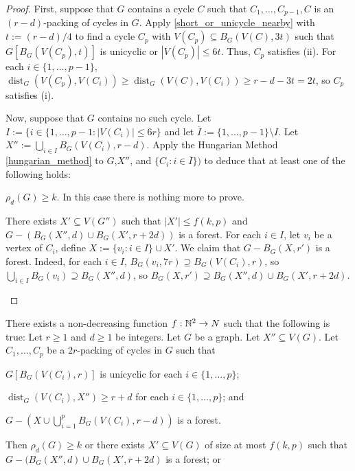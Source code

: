 \documentclass{patmorin}
\renewcommand{\ge}{\geqslant}
\renewcommand{\le}{\leqslant}
\DeclareMathOperator{\dist}{dist}
\begin{document}
\begin{proof}
  First, suppose that $G$ contains a cycle $C$ such that $C_1,\ldots,C_{p-1},C$ is an $(r-d)$-packing of cycles in $G$.  Apply \cref{short_or_unicycle_nearby} with $t:=(r-d)/4$ to find a cycle $C_p$ with $V(C_p)\subseteq B_G(V(C),3t)$ such that $G[B_G(V(C_p),t)]$ is unicyclic or $|V(C_p)|\le 6t$.  Thus, $C_p$ satisfies (ii).  For each $i\in\{1,\ldots,p-1\}$, $\dist_G(V(C_p),V(C_i))\ge \dist_G(V(C),V(C_i)) \ge r-d - 3t = 2t$, so $C_p$ satisfies (i).

  Now, suppose that $G$ contains no such cycle.  Let $I:=\{i\in\{1,\ldots,p-1:|V(C_i)|\le 6r\}$ and let $\overline{I}:=\{1,\ldots,p-1\}\setminus I$.
  Let $X'':=\bigcup_{i\in I}B_G(V(C_i),r-d)$.  Apply the Hungarian Method \cref{hungarian_method} to $G$,$X''$, and $\{C_i:i\in\overline{I}\})$ to deduce that at least one of the following holds:
  \begin{compactenum}[(a)]\setcounter{enumi}{1}
    \item $\rho_d(G)\ge k$.  In this case there is nothing more to prove.
    \item There exists $X'\subseteq V(G'')$ such that $|X'|\le f(k,p)$ and $G-(B_G(X'',d)\cup B_{G}(X',r+2d))$ is a forest. For each $i\in I$, let $v_i$ be a vertex of $C_i$, define $X:=\{v_i:i\in I\}\cup X'$.  We claim that $G-B_G(X,r')$ is a forest.  Indeed, for each $i\in I$, $B_G(v_i,7r)\supseteq B_G(V(C_i),r)$, so $\bigcup_{i\in I}B_G(v_i)\supseteq B_G(X'',d)$, so $B_G(X,r')\supseteq B_G(X'',d)\cup B_{G}(X',r+2d)$. \qedhere
  \end{compactenum}
\end{proof}


\begin{lem}\label{hungarian_method}
  There exists a non-decreasing function $f:\mathbb{N}^2\to N$ such that the following is true: Let $r\ge 1$ and $d\ge 1$ be integers.
  Let $G$ be a graph. Let $X''\subseteq V(G)$. Let $C_1,\ldots,C_p$ be a $2r$-packing of cycles in $G$ such that
  \begin{compactenum}
    \item $G[B_G(V(C_i),r)]$ is unicyclic for each $i\in\{1,\ldots,p\}$;
    \item $\dist_G(V(C_i),X'')\ge r+d$ for each $i\in\{1,\ldots,p\}$; and
    \item $G-(X\cup \bigcup_{i=1}^p B_G(V(C_i),r-d))$ is a forest.
  \end{compactenum}
  Then $\rho_d(G)\ge k$ or there exists $X'\subseteq V(G)$ of size at most $f(k,p)$ such that $G-(B_G(X'',d)\cup B_G(X',r+2d)$ is a forest; or
\end{lem}
\end{document}
